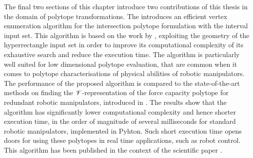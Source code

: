 The final two sections of this chapter introduce two contributions of this thesis in the domain of polytope transformations. The  introduces an efficient vertex enumeration algorithm for the intersection polytope formulation with the interval input set. This algorithm is based on the work by \citet{sasaki2011vertex}, exploiting the geometry of the hyperrectangle input set in order to improve its computational complexity of its exhaustive search and reduce the execution time. The algorithm is particularly well suited for low dimensional polytope evaluation, that are common when it comes to polytope characterisations of physical abilities of robotic manipulators. The performance of the proposed algorithm is compared to the state-of-the-art methods on finding the $\mathscr{V}$-representation of the force capacity polytope for redundant robotic manipulators, introduced in . The results show that the algorithm has significantly lower computational complexity and hence shorter execution time, in the order of magnitude of several milliseconds for standard robotic manipulators, implemented in Pyhton. Such short execution time opens doors for using these polytopes in real time applications, such as robot control. This algorithm has been published in the context of the scientific paper \citet{skuric2021robot}.

